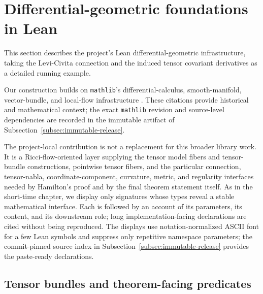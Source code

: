 \documentclass[11pt]{article}
\theoremstyle{plain}
\theoremstyle{definition}
\theoremstyle{remark}
\begin{document}
\section{Differential-geometric foundations in Lean}
\label{sec:formal-differential-geometry}

This section describes the project's Lean differential-geometric infrastructure,
taking the Levi-Civita connection and the induced tensor covariant derivatives
as a detailed running example.

Our construction builds on \texttt{mathlib}'s differential-calculus,
smooth-manifold, vector-bundle, and local-flow infrastructure
\cite{mathlib,GouezelHigherOrderCalculus,BordgCavalleriDGLean,
RothgangDGMathlib}.  These citations provide historical and mathematical
context; the exact \texttt{mathlib} revision and source-level dependencies are
recorded in the immutable artifact of
Subsection~\ref{subsec:immutable-release}.

The project-local contribution is not a replacement for this broader library
work.  It is a Ricci-flow-oriented layer supplying the tensor model fibers and
tensor-bundle constructions, pointwise tensor fibers, and the particular
connection, tensor-nabla, coordinate-component, curvature, metric, and
regularity interfaces needed by Hamilton's proof and by the final theorem
statement itself.  As in the short-time chapter, we display only signatures
whose types reveal a stable mathematical interface.  Each is followed by an
account of its parameters, its content, and its downstream role; long
implementation-facing declarations are cited without being reproduced.
The displays use notation-normalized ASCII font for a few Lean symbols and suppress
only repetitive namespace parameters; the commit-pinned source index in
Subsection~\ref{subsec:immutable-release} provides the paste-ready declarations.
\subsection{Tensor bundles and theorem-facing predicates}
\label{subsec:theorem-facing-predicates}
\end{document}
